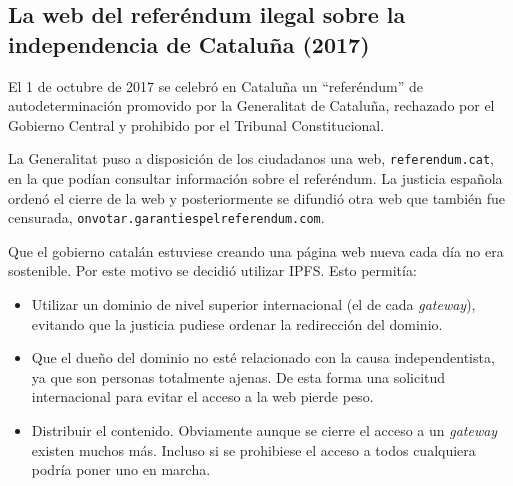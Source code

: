 \documentclass[12pt]{article} %
\begin{document}

\subsection{La web del referéndum ilegal sobre la independencia de Cataluña (2017)} %
\label{sub:la_web_del_referéndum_catalán_de_2017}

El 1 de octubre de 2017 se celebró en Cataluña un ``referéndum'' de autodeterminación promovido por la Generalitat de Cataluña, rechazado por el Gobierno Central y prohibido por el Tribunal Constitucional. 

La Generalitat puso a disposición de los ciudadanos una web, \texttt{referendum.cat}, en la que podían consultar información sobre el referéndum. La justicia española ordenó el cierre de la web y posteriormente se difundió otra web que también fue censurada, \texttt{onvotar.garantiespelreferendum.com}.

Que el gobierno catalán estuviese creando una página web nueva cada día no era sostenible. Por este motivo se decidió utilizar IPFS. Esto permitía:
\begin{itemize}
	\item Utilizar un dominio de nivel superior internacional (el de cada \textit{gateway}), evitando que la justicia pudiese ordenar la redirección del dominio.
	\item Que el dueño del dominio no esté relacionado con la causa independentista, ya que son personas totalmente ajenas. De esta forma una solicitud internacional para evitar el acceso a la web pierde peso.
	\item Distribuir el contenido. Obviamente aunque se cierre el acceso a un \textit{gateway} existen muchos más. Incluso si se prohibiese el acceso a todos cualquiera podría poner uno en marcha.
\end{itemize}




\newpage
\printbibliography
\end{document}
